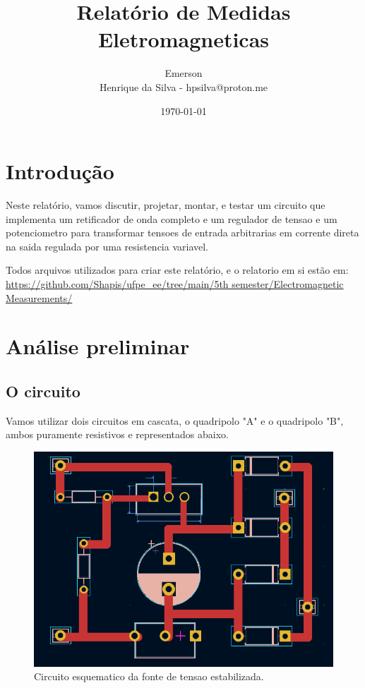\documentclass[12pt,twoside, a4paper, twocolumn]{article}
\title{Relatório de Medidas Eletromagneticas}
\author{Emerson \\ Henrique da Silva - hpsilva@proton.me}
\date{\today}
\begin{document}
\maketitle
{}
\newpage
\tableofcontents
\newpage

\section{Introdução}

Neste relatório, vamos discutir, projetar, montar, e testar um circuito que implementa um retificador de onda completo e um regulador de tensao e um potenciometro para transformar tensoes de entrada arbitrarias em corrente direta na saida regulada por uma resistencia variavel.

Todos arquivos utilizados para criar este relatório, e o relatorio em si estão em:  \url{https://github.com/Shapis/ufpe_ee/tree/main/5th semester/Electromagnetic Measurements/}

\section{Análise preliminar}

\subsection{O circuito}


Vamos utilizar dois circuitos em cascata, o quadripolo "A" e o quadripolo "B", ambos puramente resistivos e representados abaixo.

\begin{figure}[h]
    \centering
    \includegraphics[width=1\columnwidth]{images/circuito.png}
    \caption{Circuito esquematico da fonte de tensao estabilizada.}
\end{figure}
\end{document}
